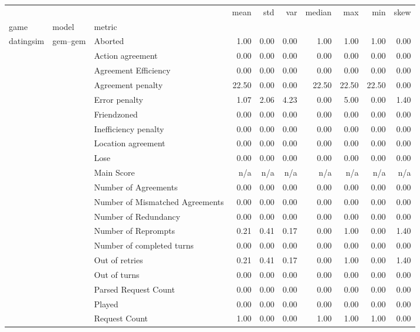 \begin{tabular}{lllrrrrrrr}
\toprule
 &  &  & mean & std & var & median & max & min & skew \\
game & model & metric &  &  &  &  &  &  &  \\
\midrule
\multirow[t]{189}{*}{datingsim} & \multirow[t]{27}{*}{gem--gem} & Aborted & 1.00 & 0.00 & 0.00 & 1.00 & 1.00 & 1.00 & 0.00 \\
 &  & Action agreement & 0.00 & 0.00 & 0.00 & 0.00 & 0.00 & 0.00 & 0.00 \\
 &  & Agreement Efficiency & 0.00 & 0.00 & 0.00 & 0.00 & 0.00 & 0.00 & 0.00 \\
 &  & Agreement penalty & 22.50 & 0.00 & 0.00 & 22.50 & 22.50 & 22.50 & 0.00 \\
 &  & Error penalty & 1.07 & 2.06 & 4.23 & 0.00 & 5.00 & 0.00 & 1.40 \\
 &  & Friendzoned & 0.00 & 0.00 & 0.00 & 0.00 & 0.00 & 0.00 & 0.00 \\
 &  & Inefficiency penalty & 0.00 & 0.00 & 0.00 & 0.00 & 0.00 & 0.00 & 0.00 \\
 &  & Location agreement & 0.00 & 0.00 & 0.00 & 0.00 & 0.00 & 0.00 & 0.00 \\
 &  & Lose & 0.00 & 0.00 & 0.00 & 0.00 & 0.00 & 0.00 & 0.00 \\
 &  & Main Score & n/a & n/a & n/a & n/a & n/a & n/a & n/a \\
 &  & Number of Agreements & 0.00 & 0.00 & 0.00 & 0.00 & 0.00 & 0.00 & 0.00 \\
 &  & Number of Mismatched Agreements & 0.00 & 0.00 & 0.00 & 0.00 & 0.00 & 0.00 & 0.00 \\
 &  & Number of Redundancy & 0.00 & 0.00 & 0.00 & 0.00 & 0.00 & 0.00 & 0.00 \\
 &  & Number of Reprompts & 0.21 & 0.41 & 0.17 & 0.00 & 1.00 & 0.00 & 1.40 \\
 &  & Number of completed turns & 0.00 & 0.00 & 0.00 & 0.00 & 0.00 & 0.00 & 0.00 \\
 &  & Out of retries & 0.21 & 0.41 & 0.17 & 0.00 & 1.00 & 0.00 & 1.40 \\
 &  & Out of turns & 0.00 & 0.00 & 0.00 & 0.00 & 0.00 & 0.00 & 0.00 \\
 &  & Parsed Request Count & 0.00 & 0.00 & 0.00 & 0.00 & 0.00 & 0.00 & 0.00 \\
 &  & Played & 0.00 & 0.00 & 0.00 & 0.00 & 0.00 & 0.00 & 0.00 \\
 &  & Request Count & 1.00 & 0.00 & 0.00 & 1.00 & 1.00 & 1.00 & 0.00 \\

\end{tabular}
